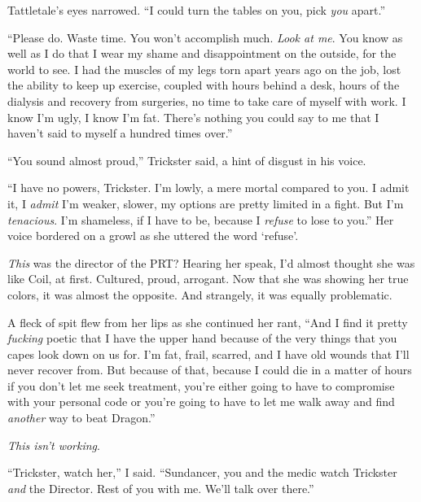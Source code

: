 Tattletale's eyes narrowed.  ``I could turn the tables on you, pick \emph{you} apart.''



``Please do.  Waste time.  You won't accomplish much.  \emph{Look at me}.  You know as well as I do that I wear my shame and disappointment on the outside, for the world to see.  I had the muscles of my legs torn apart years ago on the job, lost the ability to keep up exercise, coupled with hours behind a desk, hours of the dialysis and recovery from surgeries, no time to take care of myself with work.  I know I'm ugly, I know I'm fat.  There's nothing you could say to me that I haven't said to myself a hundred times over.''



``You sound almost proud,'' Trickster said, a hint of disgust in his voice.



``I have no powers, Trickster.  I'm lowly, a mere mortal compared to you.  I admit it, I \emph{admit} I'm weaker, slower, my options are pretty limited in a fight.  But I'm \emph{tenacious}.  I'm shameless, if I have to be, because I \emph{refuse} to lose to you.''  Her voice bordered on a growl as she uttered the word `refuse'.



\emph{This} was the director of the PRT?  Hearing her speak, I'd almost thought she was like Coil, at first.  Cultured, proud, arrogant.  Now that she was showing her true colors, it was almost the opposite.  And strangely, it was equally problematic.



A fleck of spit flew from her lips as she continued her rant, ``And I find it pretty \emph{fucking} poetic that I have the upper hand because of the very things that you capes look down on us for.  I'm fat, frail, scarred, and I have old wounds that I'll never recover from.  But because of that, because I could die in a matter of hours if you don't let me seek treatment, you're either going to have to compromise with your personal code or you're going to have to let me walk away and find \emph{another} way to beat Dragon.''



\emph{This isn't working}.



``Trickster, watch her,'' I said.  ``Sundancer, you and the medic watch Trickster \emph{and }the Director.  Rest of you with me.  We'll talk over there.''



